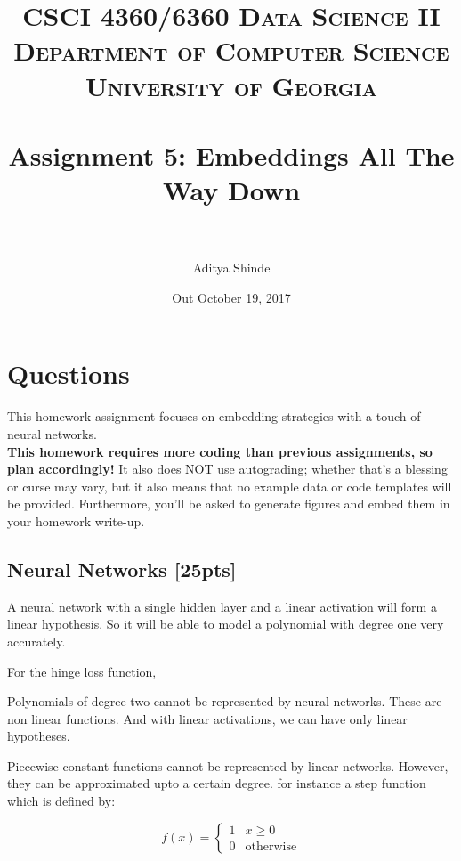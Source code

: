 \documentclass[paper=a4, fontsize=11pt]{scrartcl} %
\title{	
\normalfont \normalsize 
\textsc{CSCI 4360/6360 Data Science II} \\
\textsc{Department of Computer Science} \\
\textsc{University of Georgia} \\ [15pt] %
\horrule{0.5pt} \\[0.3cm] %
\huge Assignment 5: Embeddings All The Way Down \\ %
\horrule{2pt} \\[0.4cm] %
}
\author{Aditya Shinde} %
\date{\normalsize Out October 19, 2017}
\numberwithin{figure}{section} %
\numberwithin{table}{section} %
\begin{document}
\maketitle %


\section*{Questions}

This homework assignment focuses on embedding strategies with a touch of neural networks. \\

\textbf{This homework requires more coding than previous assignments, so plan accordingly!} It also does NOT use autograding; whether that's a blessing or curse may vary, but it also means that no example data or code templates will be provided. Furthermore, you'll be asked to generate figures and embed them in your homework write-up.

\setcounter{subsection}{0}

\subsection{Neural Networks \textbf{[25pts]}}

\par A neural network with a single hidden layer and a linear activation will form a linear hypothesis. So it will be able to model a polynomial with degree one very accurately.\\

\par For the hinge loss function, \\

\par Polynomials of degree two cannot be represented by neural networks. These are non linear functions. And with linear activations, we can have only linear hypotheses. \\

\par Piecewise constant functions cannot be represented by linear networks. However, they can be approximated upto a certain degree. for instance a step function which is defined by:

$$
f(x) = \begin{cases}
	1 & x \ge 0 \\
	0 & \textrm{otherwise}
\end{cases}
$$
\end{document}
